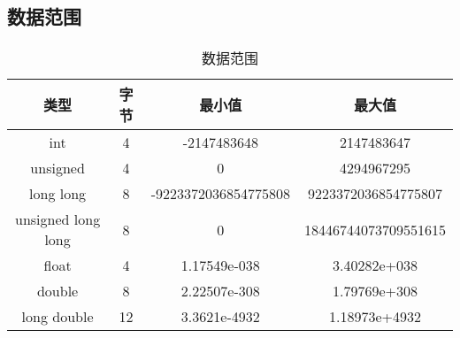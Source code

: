 ﻿\subsection{数据范围}
	\paragraph{}
	\begin{table}[!htbp]
		\begin{tabular}{|c|c|c|c|}
		\hline
		 \textbf{类型} & \textbf{字节} & \textbf{最小值} & \textbf{最大值}  \\
		\hline
		int & 4 & -2147483648 & 2147483647 \\
		\hline
		unsigned & 4 & 0 & 4294967295 \\
		\hline
		long long & 8 & -9223372036854775808 & 9223372036854775807 \\
		\hline
		unsigned long long & 8 & 0 & 18446744073709551615 \\
		\hline
		float & 4 & 1.17549e-038 & 3.40282e+038 \\
		\hline
		double & 8 & 2.22507e-308 & 1.79769e+308 \\
		\hline
		long double & 12 & 3.3621e-4932 & 1.18973e+4932 \\
		\hline
		\end{tabular}
		\caption{数据范围}
	\end{table}

